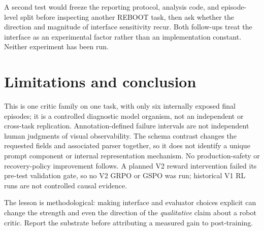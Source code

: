\documentclass{article}
\begin{document}
A second test would freeze the reporting protocol, analysis code, and episode-level split before inspecting another REBOOT task, then ask whether the direction and magnitude of interface sensitivity recur. Both follow-ups treat the interface as an experimental factor rather than an implementation constant. Neither experiment has been run.

\section{Limitations and conclusion}
This is one critic family on one task, with only six internally exposed final episodes; it is a controlled diagnostic model organism, not an independent or cross-task replication. Annotation-defined failure intervals are not independent human judgments of visual observability. The schema contrast changes the requested fields and associated parser together, so it does not identify a unique prompt component or internal representation mechanism. No production-safety or recovery-policy improvement follows. A planned V2 reward intervention failed its pre-test validation gate, so no V2 GRPO or GSPO was run; historical V1 RL runs are not controlled causal evidence.

The lesson is methodological: making interface and evaluator choices explicit can change the strength and even the direction of the \emph{qualitative} claim about a robot critic. Report the substrate before attributing a measured gain to post-training.

\clearpage
\label{referencesstart}

\end{document}
